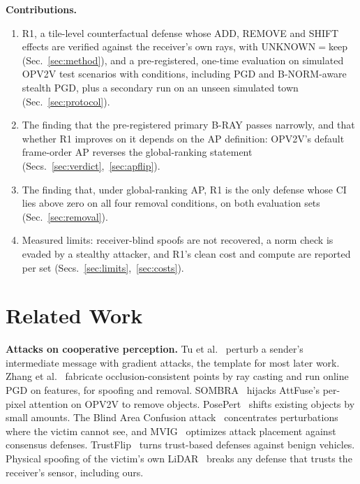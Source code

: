 \documentclass[conference]{IEEEtran}
\begin{document}
\textbf{Contributions.}
\begin{enumerate}
\item R1, a tile-level counterfactual defense whose ADD, REMOVE and SHIFT effects are verified against the
receiver's own rays, with UNKNOWN${}={}$keep (Sec.~\ref{sec:method}), and a pre-registered, one-time evaluation
on \TestScenarios{} simulated OPV2V test scenarios with \NumConditions{} conditions, including PGD and
B-NORM-aware stealth PGD, plus a secondary run on an unseen simulated town (Sec.~\ref{sec:protocol}).
\item The finding that the pre-registered primary B-RAY passes narrowly, and that whether R1 improves on it
depends on the AP definition: OPV2V's default frame-order AP reverses the global-ranking statement
(Secs.~\ref{sec:verdict},~\ref{sec:apflip}).
\item The finding that, under global-ranking AP, R1 is the only defense whose CI lies above zero on all four
removal conditions, on both evaluation sets (Sec.~\ref{sec:removal}).
\item Measured limits: receiver-blind spoofs are not recovered, a norm check is evaded by a stealthy attacker,
and R1's clean cost and compute are reported per set (Secs.~\ref{sec:limits},~\ref{sec:costs}).
\end{enumerate}

\section{Related Work}
\textbf{Attacks on cooperative perception.}
Tu et al.~\cite{tu2021adversarial} perturb a sender's intermediate message with gradient attacks, the
template for most later work. Zhang et al.~\cite{zhang2024cad} fabricate occlusion-consistent points by ray
casting and run online PGD on features, for spoofing and removal. SOMBRA~\cite{wang2025lucia} hijacks
AttFuse's per-pixel attention on OPV2V to remove objects. PosePert~\cite{zhang2026poseguard} shifts existing
objects by small amounts. The Blind Area Confusion attack~\cite{tao2026gcp} concentrates perturbations where
the victim cannot see, and MVIG~\cite{tao2026mvig} optimizes attack placement against consensus defenses.
TrustFlip~\cite{liu2026trustflip} turns trust-based defenses against benign vehicles. Physical spoofing of the
victim's own LiDAR~\cite{cao2019advlidar} breaks any defense that trusts the receiver's sensor, including ours.
\end{document}
